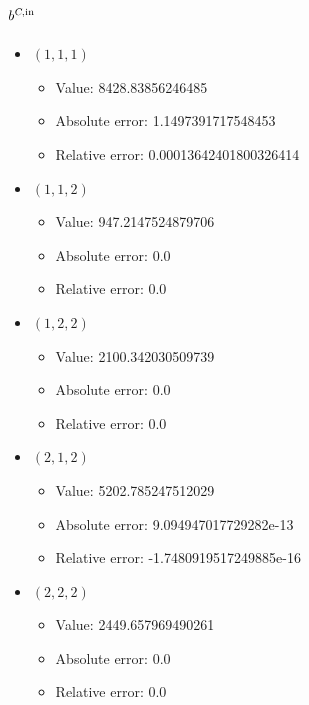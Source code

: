 \documentclass{article}%
\begin{document}
\subsection{$b^{\textsl{C},\text{in}}$}%
\begin{itemize}%
	\item $(1, 1, 1)$%
	\begin{itemize}%
		\item Value: 8428.83856246485%
		\item Absolute error: 1.1497391717548453%
		\item Relative error: 0.00013642401800326414%
	\end{itemize}%
	\item $(1, 1, 2)$%
	\begin{itemize}%
		\item Value: 947.2147524879706%
		\item Absolute error: 0.0%
		\item Relative error: 0.0%
	\end{itemize}%
	\item $(1, 2, 2)$%
	\begin{itemize}%
		\item Value: 2100.342030509739%
		\item Absolute error: 0.0%
		\item Relative error: 0.0%
	\end{itemize}%
	\item $(2, 1, 2)$%
	\begin{itemize}%
		\item Value: 5202.785247512029%
		\item Absolute error: 9.094947017729282e-13%
		\item Relative error: -1.7480919517249885e-16%
	\end{itemize}%
	\item $(2, 2, 2)$%
	\begin{itemize}%
		\item Value: 2449.657969490261%
		\item Absolute error: 0.0%
		\item Relative error: 0.0%
	\end{itemize}%
\end{itemize}%
\end{document}
